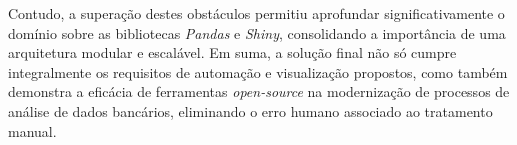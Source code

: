 \documentclass[12pt, a4paper]{article}
\begin{document}
Contudo, a superação destes obstáculos permitiu aprofundar significativamente o domínio sobre as bibliotecas \textit{Pandas} e \textit{Shiny}, consolidando a importância de uma arquitetura modular e escalável. Em suma, a solução final não só cumpre integralmente os requisitos de automação e visualização propostos, como também demonstra a eficácia de ferramentas \textit{open-source} na modernização de processos de análise de dados bancários, eliminando o erro humano associado ao tratamento manual.

\newpage
 

\end{document}
